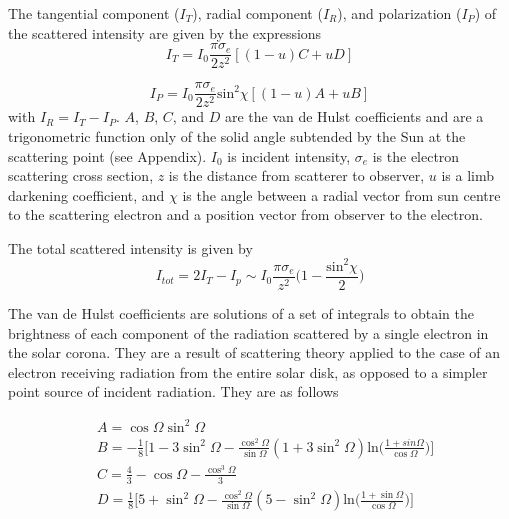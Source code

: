 The tangential component ($I_T$), radial component ($I_R$), and polarization ($I_P$) of the scattered intensity are given by the expressions
\begin{equation}
I_T=I_0\frac{\pi \sigma_e}{2z^2}[(1-u)C +uD]
\end{equation}

\begin{equation}
I_P=I_0\frac{\pi \sigma_e}{2z^2}\mathrm{sin}^2\chi[(1-u)A +uB]
\end{equation}
with $I_R = I_T-I_P$. $A$, $B$, $C$, and $D$ are the van de Hulst coefficients and are a trigonometric function only of the solid angle subtended by the Sun at the scattering point (see Appendix). $I_0$ is incident intensity, $\sigma_e$ is the electron scattering cross section, $z$ is the distance from scatterer to observer, $u$ is a limb darkening coefficient, and $\chi$ is the angle between a radial vector from sun centre to the scattering electron and a position vector from observer to the electron. 

The total scattered intensity is given by
\begin{equation}
I_{tot} =  2I_T - I_p \sim I_0\frac{\pi \sigma_e}{z^2}\bigg(1 - \frac{\mathrm{sin}^2\chi}{2}\bigg)
\end{equation}




The van de Hulst coefficients are solutions of a set of integrals to obtain the brightness of each component of the radiation scattered by a single electron in the solar corona. They are a result of scattering theory applied to the case of an electron receiving radiation from the entire solar disk, as opposed to a simpler point source of incident radiation. They are as follows

\begin{subequations}
\begin{align}
\tag{a}
& A = \cos \Omega \sin^2 \Omega \\
\tag{b}
& B = -\frac{1}{8}\bigg[1 - 3\sin^2\Omega -\frac{\cos^2\Omega}{\sin\Omega}(1+3\sin^2\Omega)\textrm{ln}\bigg(\frac{1+sin\Omega}{\cos\Omega}\bigg)\bigg] \\
\tag{c}
& C = \frac{4}{3} - \cos\Omega - \frac{\cos^3\Omega}{3} \\
\tag{d}
& D = \frac{1}{8}\bigg[5 + \sin^2\Omega -\frac{\cos^2\Omega}{\sin\Omega}(5-\sin^2\Omega)\textrm{ln}\bigg(\frac{1+\sin\Omega}{\cos\Omega}\bigg)\bigg] 
\end{align}
\end{subequations}

